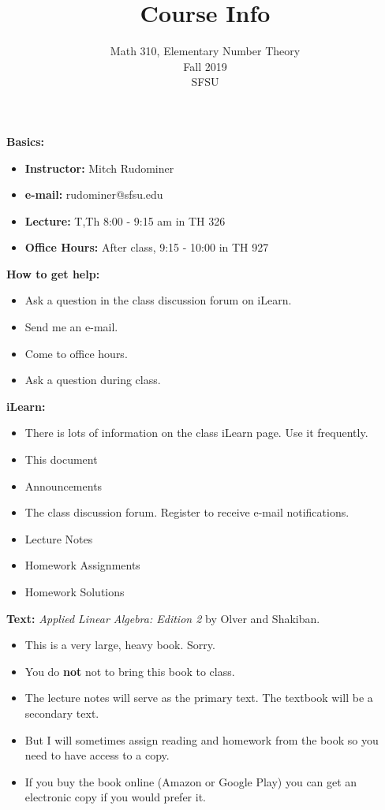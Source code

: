 \documentclass[oneside,12pt]{amsart}
\begin{document}
\title{Course Info}
\author{Math 310, Elementary Number Theory  \\ Fall 2019 \\ SFSU }
\date{}

\maketitle

\textbf{Basics:}
\begin{itemize}
\item \textbf{Instructor:} Mitch Rudominer
\item \textbf{e-mail:} rudominer@sfsu.edu
\item \textbf{Lecture:}  T,Th 8:00 - 9:15 am in TH 326
\item \textbf{Office Hours:} After class, 9:15 - 10:00 in TH 927
\end{itemize}

\bigskip

\textbf{How to get help:}
\begin{itemize}
\item Ask a question in the class discussion forum on iLearn.
\item Send me an e-mail.
\item Come to office hours.
\item Ask a question during class. 
\end{itemize}

\bigskip

\textbf{iLearn:}
\begin{itemize}
\item There is lots of information on the class iLearn page. Use it frequently.
\item This document
\item Announcements
\item The class discussion forum. Register to receive e-mail notifications.
\item Lecture Notes
\item Homework Assignments
\item Homework Solutions
\end{itemize}

\bigskip

\textbf{Text:} \emph{Applied Linear Algebra: Edition 2} by Olver and Shakiban.
\begin{itemize}
\item This is a very large, heavy book. Sorry.
\item You do \textbf{not} not to bring this book to class.
\item The lecture notes will serve as the primary text. The textbook will be a secondary text.
\item But I will sometimes assign reading and homework from the book so you need to have access to a copy.
\item If you buy the book online (Amazon or Google Play) you can get an electronic copy if you would prefer it.
\end{itemize}
\end{document}
